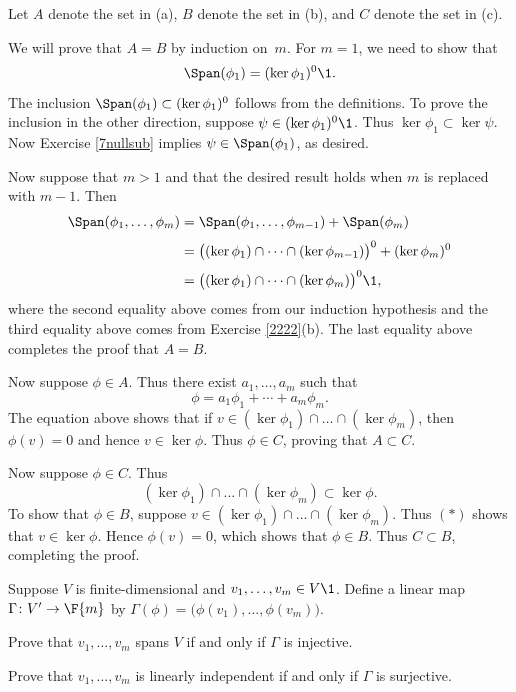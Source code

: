 \begin{Solution}
Let $A$ denote the set in (a), $B$ denote the set in (b), and $C$ denote the set in (c).

We will prove that $A = B$ by induction on~$m$. For $m = 1$, we need to show that
\[
\Span(\phi_1) = (\ker \phi_1)^0\1.
\]
The inclusion $\Span(\phi_1) \subset (\ker \phi_1)^0$ follows from the definitions. To prove the inclusion in the other direction, suppose
$\psi \in (\ker \phi_1)^0\1$. Thus $\ker \phi_1 \subset \ker \psi$. Now Exercise \ref{7nullsub} implies $\psi \in \Span(\phi_1)$, as desired.

Now suppose that $m >1$ and that the desired result holds when $m$ is replaced with $m-1$. Then
\begin{align*}
\Span(\phi_1, \dots, \phi_m) &= \Span(\phi_1, \dots, \phi_{m-1}) + \Span(\phi_m) \\[3bp]
&= \bigl( (\ker \phi_1) \cap \dots \cap (\ker \phi_{m-1})\bigr)^0 + (\ker \phi_m)^0 \\[3bp]
&= \bigl( (\ker \phi_1) \cap \dots \cap (\ker \phi_m)\bigr)^0\1,
\end{align*}
where the second equality above comes from our induction hypothesis and the third equality above comes from Exercise \ref{2222}(b). The last equality above completes the proof that $A = B$.

Now suppose $\phi \in A$. Thus there exist $a_1, \ldots, a_m$ such that
\[
\phi = a_1 \phi_1 + \cdots + a_m \phi_m.
\]
The equation above shows that if $v \in (\ker \phi_1) \cap \dots \cap (\ker \phi_m)$, then $\phi(v) = 0$ and hence $v \in \ker \phi$. Thus $\phi \in C$, proving that
$A \subset C$.

Now suppose $\phi \in C$. Thus
\[ \tag{$(*)$}
(\ker \phi_1) \cap \dots \cap (\ker \phi_m) \subset \ker \phi.
\]
To show that $\phi \in B$, suppose $v \in (\ker \phi_1) \cap \dots \cap (\ker \phi_m)$. Thus $(*)$ shows that $v \in \ker \phi$. Hence $\phi(v) = 0$, which shows that $\phi \in B$. Thus $C \subset B$, completing the proof.
\end{Solution}

\exercise
Suppose $V$ is finite-dimensional and $v_1, \dots, v_m \in V\1$. Define a linear map $\Gamma \colon V' \to \F{m}$ by
$
\Gamma(\phi) = \bigl(\phi(v_1), \dots, \phi(v_m) \bigr)$.
\begin{subtheorem}
\item
Prove that $v_1, \dots, v_m$ spans $V$ if and only if $\Gamma$ is injective.
\item
Prove that $v_1, \dots, v_m$ is linearly independent if and only if $\Gamma$ is surjective.
\end{subtheorem}
\exercisesubtheoremend

